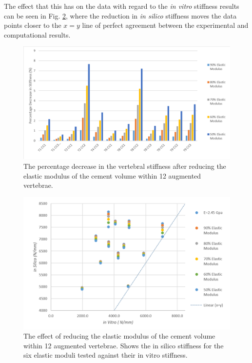 The effect that this has on the data with regard to the \textit{in vitro} stiffness results can be seen in Fig. \ref{fig:redEModscatter}, where the reduction in \textit{in silico} stiffness moves the data points closer to the $x = y$ line of perfect agreement between the experimental and computational results.


\begin{figure}[ht!]
\centering
\includegraphics[width=\textwidth]{images/reductionOfEMod_Bar.png}
\caption{The percentage decrease in the vertebral stiffness after reducing the elastic modulus of the cement volume within 12 augmented vertebrae.}
\label{fig:redEModBar}
\end{figure}

\begin{figure}[ht!]
\centering
\includegraphics[width=5.3in]{images/reductionOfEMod_Scatter.png}
\caption{The effect of reducing the elastic modulus of the cement volume within 12 augmented vertebrae. Shows the in silico stiffness for the six elastic moduli tested against their in vitro stiffness. }
\label{fig:redEModscatter}
\end{figure}

